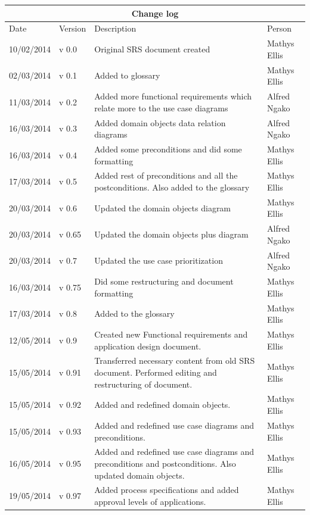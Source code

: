 \documentclass[12pt]{article}
\begin{document}
\begin{center}
\begin{longtable}{|l|p{1.4cm}|p{8cm}|p{2.8cm}|}
\hline
\multicolumn{4}{|c|}{\bf Change log} \\
\hline
 Date & Version & Description &  Person \\
\hline
10/02/2014 & v 0.0 & Original SRS document created & Mathys Ellis \\
\hline
02/03/2014 & v 0.1 & Added to glossary & Mathys Ellis \\
\hline
11/03/2014 & v 0.2 & Added more functional requirements which relate more to the use case diagrams & Alfred Ngako \\
\hline
16/03/2014 & v 0.3 & Added domain objects data relation diagrams & Alfred Ngako \\
\hline
16/03/2014 & v 0.4 & Added some preconditions and did some formatting & Mathys Ellis \\
\hline
17/03/2014 & v 0.5 & Added rest of preconditions and all the postconditions. Also added to the glossary & Mathys Ellis \\
\hline
20/03/2014 & v 0.6 & Updated the domain objects diagram  & Mathys Ellis \\
\hline
20/03/2014 & v 0.65 & Updated the domain objects plus diagram  & Alfred Ngako \\
\hline
20/03/2014 & v 0.7 & Updated the use case prioritization  & Alfred Ngako \\
\hline
16/03/2014 & v 0.75 & Did some restructuring and document formatting & Mathys Ellis \\
\hline
17/03/2014 & v 0.8 & Added to the glossary & Mathys Ellis \\
\hline
12/05/2014 & v 0.9 & Created new Functional requirements and application design document. & Mathys Ellis \\
\hline
15/05/2014 & v 0.91 & Transferred necessary content from old SRS document. Performed editing and restructuring of document. & Mathys Ellis \\
\hline
15/05/2014 & v 0.92 & Added and redefined domain objects. & Mathys Ellis \\
\hline
15/05/2014 & v 0.93 & Added and redefined use case diagrams and preconditions. & Mathys Ellis \\
\hline
16/05/2014 & v 0.95 & Added and redefined use case diagrams and preconditions and postconditions. Also updated domain objects. & Mathys Ellis \\
\hline
19/05/2014 & v 0.97 & Added process specifications and added approval levels of applications. & Mathys Ellis \\

\end{longtable}
\end{center}
\end{document}
